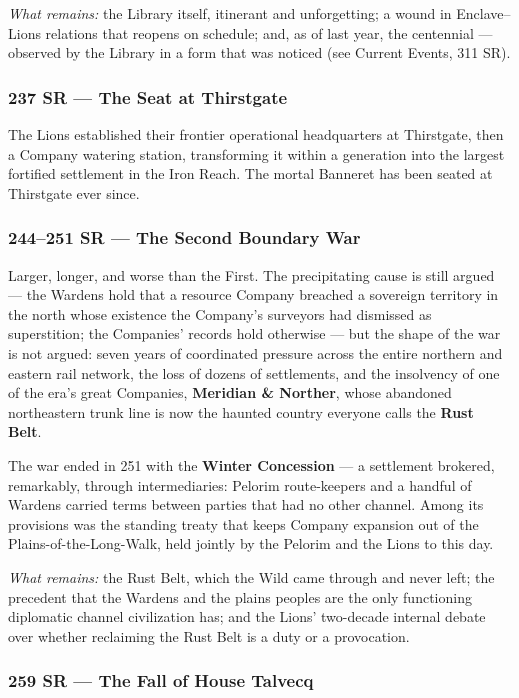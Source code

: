\textit{What remains:} the Library itself, itinerant and unforgetting; a wound in Enclave--Lions relations that reopens on schedule; and, as of last year, the centennial --- observed by the Library in a form that was noticed (see Current Events, 311 SR).

\subsubsection{237 SR --- The Seat at Thirstgate}

The Lions established their frontier operational headquarters at Thirstgate, then a Company watering station, transforming it within a generation into the largest fortified settlement in the Iron Reach. The mortal Banneret has been seated at Thirstgate ever since.

\subsubsection{244--251 SR --- The Second Boundary War}

Larger, longer, and worse than the First. The precipitating cause is still argued --- the Wardens hold that a resource Company breached a sovereign territory in the north whose existence the Company's surveyors had dismissed as superstition; the Companies' records hold otherwise --- but the shape of the war is not argued: seven years of coordinated pressure across the entire northern and eastern rail network, the loss of dozens of settlements, and the insolvency of one of the era's great Companies, \textbf{Meridian \& Norther}, whose abandoned northeastern trunk line is now the haunted country everyone calls the \textbf{Rust Belt}.

The war ended in 251 with the \textbf{Winter Concession} --- a settlement brokered, remarkably, through intermediaries: Pelorim route-keepers and a handful of Wardens carried terms between parties that had no other channel. Among its provisions was the standing treaty that keeps Company expansion out of the Plains-of-the-Long-Walk, held jointly by the Pelorim and the Lions to this day.

\textit{What remains:} the Rust Belt, which the Wild came through and never left; the precedent that the Wardens and the plains peoples are the only functioning diplomatic channel civilization has; and the Lions' two-decade internal debate over whether reclaiming the Rust Belt is a duty or a provocation.

\subsubsection{259 SR --- The Fall of House Talvecq}

